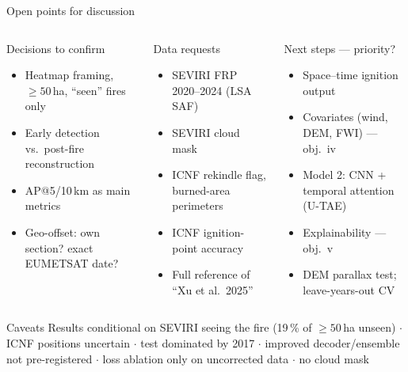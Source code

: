 \documentclass[10pt,aspectratio=169]{beamer}
\begin{document}
\begin{frame}{Open points for discussion}
  \small
  \begin{columns}[T]
    \begin{block}{Decisions to confirm}
      \footnotesize
      \begin{itemize}
        \item Heatmap framing, $\geq 50$\,ha, ``seen'' fires only
        \item Early detection vs.\ post-fire reconstruction
        \item AP@5/10\,km as main metrics
        \item Geo-offset: own section? exact EUMETSAT date?
      \end{itemize}
    \end{block}
    \begin{block}{Data requests}
      \footnotesize
      \begin{itemize}
        \item SEVIRI FRP 2020--2024 (LSA SAF)
        \item SEVIRI cloud mask
        \item ICNF rekindle flag, burned-area perimeters
        \item ICNF ignition-point accuracy
        \item Full reference of ``Xu et al.\ 2025''
      \end{itemize}
    \end{block}
    \begin{block}{Next steps --- priority?}
      \footnotesize
      \begin{itemize}
        \item Space--time ignition output
        \item Covariates (wind, DEM, FWI) --- obj.\ iv
        \item Model 2: CNN + temporal attention (U-TAE)
        \item Explainability --- obj.\ v
        \item DEM parallax test; leave-years-out CV
      \end{itemize}
    \end{block}
  \end{columns}
  \vspace{4pt}
  \begin{alertblock}{Caveats}
    \footnotesize
    Results conditional on SEVIRI seeing the fire (19\,\% of $\geq 50$\,ha unseen) $\cdot$ ICNF positions uncertain $\cdot$
    test dominated by 2017 $\cdot$ improved decoder/ensemble not pre-registered $\cdot$ loss ablation only on uncorrected data $\cdot$ no cloud mask
  \end{alertblock}
\end{frame}
\end{document}
